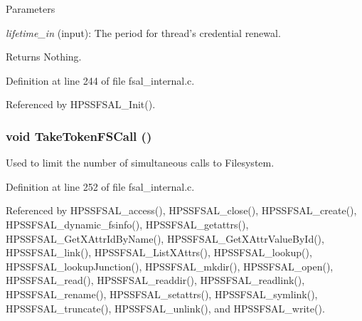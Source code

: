 \begin{DoxyParams}{Parameters}
\item[{\em lifetime\_\-in}](input): The period for thread's credential renewal.\end{DoxyParams}
\begin{DoxyReturn}{Returns}
Nothing. 
\end{DoxyReturn}


Definition at line 244 of file fsal\_\-internal.c.

Referenced by HPSSFSAL\_\-Init().
\subsubsection[{TakeTokenFSCall}]{\setlength{\rightskip}{0pt plus 5cm}void TakeTokenFSCall ()}\label{fsal__internal_8c_a880a1463c400047bfd0401f0b9c431a7}
Used to limit the number of simultaneous calls to Filesystem. 

Definition at line 252 of file fsal\_\-internal.c.

Referenced by HPSSFSAL\_\-access(), HPSSFSAL\_\-close(), HPSSFSAL\_\-create(), HPSSFSAL\_\-dynamic\_\-fsinfo(), HPSSFSAL\_\-getattrs(), HPSSFSAL\_\-GetXAttrIdByName(), HPSSFSAL\_\-GetXAttrValueById(), HPSSFSAL\_\-link(), HPSSFSAL\_\-ListXAttrs(), HPSSFSAL\_\-lookup(), HPSSFSAL\_\-lookupJunction(), HPSSFSAL\_\-mkdir(), HPSSFSAL\_\-open(), HPSSFSAL\_\-read(), HPSSFSAL\_\-readdir(), HPSSFSAL\_\-readlink(), HPSSFSAL\_\-rename(), HPSSFSAL\_\-setattrs(), HPSSFSAL\_\-symlink(), HPSSFSAL\_\-truncate(), HPSSFSAL\_\-unlink(), and HPSSFSAL\_\-write().